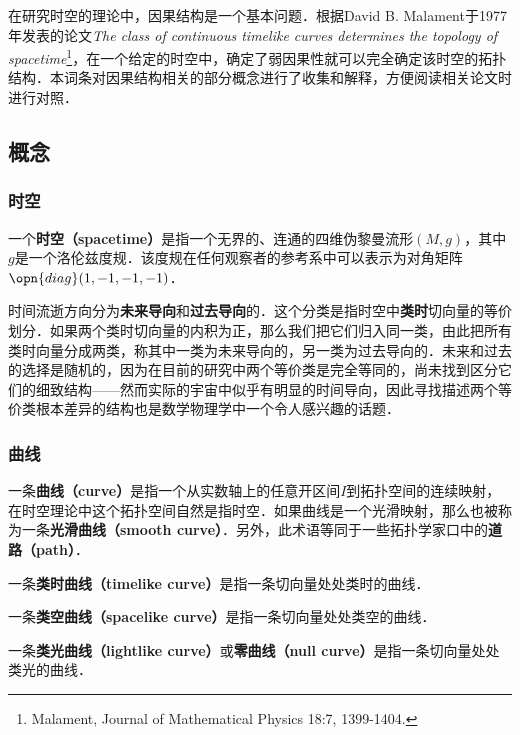 



在研究时空的理论中，因果结构是一个基本问题．根据David B. Malament于1977年发表的论文\textsl{The class of continuous timelike curves determines the topology of spacetime}\footnote{Malament, Journal of Mathematical Physics 18:7, 1399-1404. }，在一个给定的时空中，确定了弱因果性就可以完全确定该时空的拓扑结构．本词条对因果结构相关的部分概念进行了收集和解释，方便阅读相关论文时进行对照．

\subsection{概念}

\subsubsection{时空}

一个\textbf{时空（spacetime）}是指一个无界的、连通的四维伪黎曼流形$(M, g)$，其中$g$是一个洛伦兹度规．该度规在任何观察者的参考系中可以表示为对角矩阵$\opn{diag}(1, -1, -1, -1)$．

时间流逝方向分为\textbf{未来导向}和\textbf{过去导向}的．这个分类是指时空中\textbf{类时}切向量的等价划分．如果两个类时切向量的内积为正，那么我们把它们归入同一类，由此把所有类时向量分成两类，称其中一类为未来导向的，另一类为过去导向的．未来和过去的选择是随机的，因为在目前的研究中两个等价类是完全等同的，尚未找到区分它们的细致结构——然而实际的宇宙中似乎有明显的时间导向，因此寻找描述两个等价类根本差异的结构也是数学物理学中一个令人感兴趣的话题．

\subsubsection{曲线}

一条\textbf{曲线（curve）}是指一个从实数轴上的任意开区间$I$到拓扑空间的连续映射，在时空理论中这个拓扑空间自然是指时空．如果曲线是一个光滑映射，那么也被称为一条\textbf{光滑曲线（smooth curve）}．另外，此术语等同于一些拓扑学家口中的\textbf{道路（path）}．

一条\textbf{类时曲线（timelike curve）}是指一条切向量处处类时的曲线．

一条\textbf{类空曲线（spacelike curve）}是指一条切向量处处类空的曲线．

一条\textbf{类光曲线（lightlike curve）}或\textbf{零曲线（null curve）}是指一条切向量处处类光的曲线．

